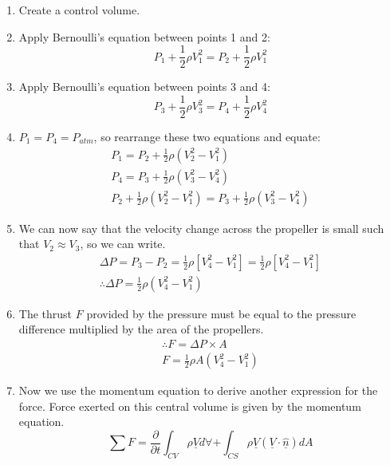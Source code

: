 \documentclass[class=report, crop=false, 12pt,a4paper]{standalone}
\begin{document}
\begin{enumerate}[noitemsep]
  \item Create a control volume. 
  \item Apply Bernoulli's equation between points 1 and 2:
    \begin{equation}
      P_1 + \frac{1}{2} \rho V_1^2 = P_2 + \frac{1}{2} \rho V_1^2
    \end{equation}
  \item Apply Bernoulli's equation between points 3 and 4:
    \begin{equation}
      P_3 + \frac{1}{2} \rho V_3^2 = P_4 + \frac{1}{2} \rho V_4^2
    \end{equation}
  \item $P_1 = P_4 = P_{atm}$, so rearrange these two equations and equate:
    \begin{gather}
      P_1 = P_2 + \frac{1}{2}\rho (V_2^2 - V_1^2)\\
      P_4 = P_3 + \frac{1}{2}\rho (V_3^2 - V_4^2)\\
      P_2 + \frac{1}{2}\rho (V_2^2 - V_1^2) = P_3 + \frac{1}{2}\rho (V_3^2 - V_4^2)
    \end{gather}
  \item We can now say that the velocity change across the propeller is small such that $V_2 \approx V_3$, so we can write.
    \begin{gather}
      \Delta P = P_3 - P_2 = \frac{1}{2} \rho [ V_4^2 - V_1^2] = \frac{1}{2} \rho [V_4^2 - V_1^2]\\
      \therefore \Delta P = \frac{1}{2} \rho (V_4^2 - V_1^2)
    \end{gather}
  \item The thrust $F$ provided by the pressure must be equal to the pressure difference multiplied by the area of the propellers. 
    \begin{gather}
      \therefore F = \Delta P \times A\\
      F = \frac{1}{2} \rho A (V_4^2 - V_1^2) \label{thrustprop}
    \end{gather}
  \item Now we use the momentum equation to derive another expression for the force. Force exerted on this central volume is given by the momentum equation. 
    \begin{equation}
      \sum F = \frac{\partial}{\partial t} \int_{CV} \rho \underline{V} d \forall + \int_{CS} \rho \underline{V} (\underline{V} \cdot \underline{\hat{n}}) dA
    \end{equation}

\end{enumerate}
\end{document}
